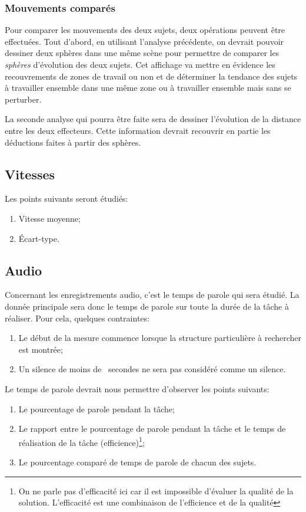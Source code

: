 \documentclass[a4paper,fleqn]{report}
\begin{document}
				\subsubsection{Mouvements comparés}
					Pour comparer les mouvements des deux sujets, deux opérations peuvent être effectuées.
					Tout d'abord, en utilisant l'analyse précédente, on devrait pouvoir dessiner deux sphères dans une même scène  pour permettre de comparer les \emph{sphères} d'évolution des deux sujets.
					Cet affichage va mettre en évidence les recouvrements de zones de travail ou non et de déterminer la tendance des sujets à travailler ensemble dans une même zone ou à travailler ensemble mais sans se perturber.

					La seconde analyse qui pourra être faite sera de dessiner l'évolution de la distance entre les deux effecteurs.
					Cette information devrait recouvrir en partie les déductions faites à partir des sphères.

			\subsection{Vitesses}
				Les points suivants seront étudiés:
				\begin{enumerate}
					\item Vitesse moyenne;
					\item Écart-type.
				\end{enumerate}

			\subsection{Audio}
				Concernant les enregistrements audio, c'est le temps de parole qui sera étudié.
				La donnée principale sera donc le temps de parole sur toute la durée de la tâche à réaliser.
				Pour cela, quelques contraintes:
				\begin{enumerate}
					\item Le début de la mesure commence lorsque la structure particulière à rechercher est montrée;
					\item Un silence de moins de ~secondes ne sera pas considéré comme un silence.
				\end{enumerate}
				Le temps de parole devrait nous permettre d'observer les points suivants:
				\begin{enumerate}
					\item Le pourcentage de parole pendant la tâche;
					\item Le rapport entre le pourcentage de parole pendant la tâche et le temps de réalisation de la tâche (efficience)\footnote{On ne parle pas d'efficacité ici car il est impossible d'évaluer la qualité de la solution. L'efficacité est une combinaison de l'efficience et de la qualité};
					\item Le pourcentage comparé de temps de parole de chacun des sujets.
				\end{enumerate}
\end{document}
